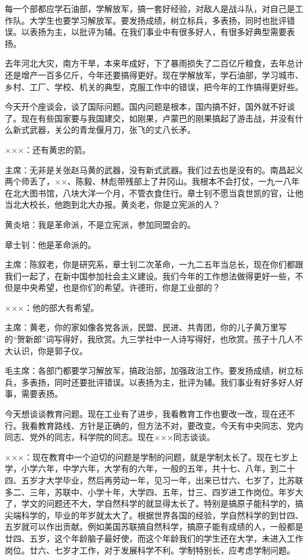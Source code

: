 每一个部都应学石油部，学解放军，搞一套好经验，对敌人是战斗队，对自己是工作队。大学生也要学习解放军。要发扬成绩，树立标兵，多表扬，同时也批评错误。以表扬为主，以批评为辅。在我们事业中有很多好人，有很多好典型需要表扬。

去年河北大灾，南方干旱，本来年成好，下了暴雨损失了二百亿斤粮食，去年总计还是增产一百多亿斤，今年还要搞得更好。现在学解放军，学石油部，学习城市、乡村、工厂、学校、机关的典型，克服工作中的错误，把今年的工作搞得更好些。

今天开个座谈会，谈了国际问题。国内问题是根本，国内搞不好，国外就不好谈了。现在有些国家要与我国建交，如刚果，卢蒙巴的刚果搞起了游击战，并没有什么新式武器，关公的青龙偃月刀，张飞的丈八长矛。

×××：还有黄忠的箭。

主席：无非是关张赵马黄的武器，没有新式武器。我们过去也是没有的。南昌起义两个师丢了，××、陈毅、林彪带残部上了井冈山。我根本不会打仗，一九一八年在北大图书馆，八块大洋一个月，不管衣食住行。章士钊不愿当袁世凯的官，让他当北大校长，他跑到北大办报。黄炎老，你是立宪派的人？

黄炎培：我是革命派，不是立宪派，参加同盟会的。

章士钊：他是革命派的。

主席：陈叙老，你是研究系，章士钊二次革命，一九二五年当总长，现在你们都跟我们一起了，在新中国参加社会主义建设。我们今年的工作想法做得更好一些，不但是中央希望，也是你们的希望。许德珩，你是工业部的？

×××：他的部大有希望。

主席：黄老，你的家如像各党各派，民盟、民进、共青团，你的儿子黄万里写的“贺新郎”词写得好，我欣赏。九三学社中一人诗写得好，也欣赏。孩子十几人不大认识，你是郭子仪。

毛主席：各部门都要学习解放军，搞政治部，加强政治工作。要发扬成绩，树立标兵，多表扬，同时还要批评错误。以表扬为主，批评为辅。我们事业有好多好人好事，需要表扬。

今天想谈谈教育问题。现在工业有了进步，我看教育工作也要改一改，现在还不行。我看教育路线、方针是正确的，但方法不对，要改变。今天有中央同志、党内同志、党外的同志，科学院的同志。现在×××同志谈谈。

×××：现在教育中一个迫切的问题是学制的问题，就是学制太长了。现在七岁上学，小学六年，中学六年，大学有的六年，一般的五年，共十七、八年，到二十四、五岁才大学毕业，然后再劳动一年，见习一年，出来已廿六、七岁了，比苏联多二、三年，苏联中、小学十年，大学四、五年，廿三、四岁进工作岗位。年岁大了，学文的问题还不大，学自然科学的就显得太长了。特别是搞原子能科学的，搞尖端科学的，毕业的年岁就太大了。根据世界各国的经验，学自然科学的到廿四、五岁就可以作出贡献。例如美国苏联搞自然科学，搞原子能有成绩的人，一般都是廿四、五岁，这个年龄脑子最好使，而这个年龄我们的学生还在大学，未进入工作岗位。廿六、七岁才工作，对于发展科学不利。学制特别长，应考虑学制问题。

